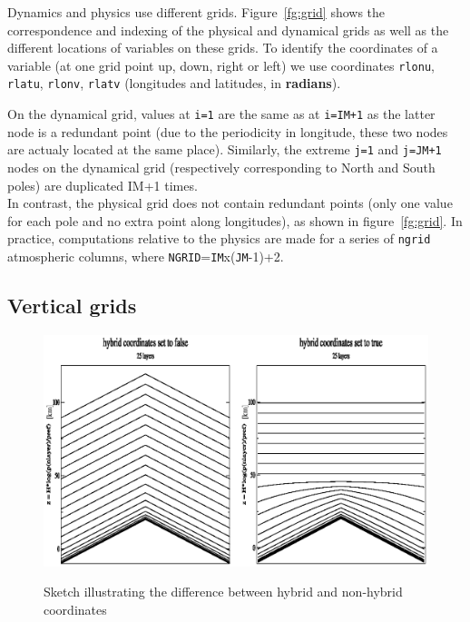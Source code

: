 Dynamics and physics use different grids.
Figure~\ref{fg:grid} shows the correspondence and indexing
of the physical and dynamical grids
as well as the different locations of variables on these grids.
To identify the coordinates of a variable (at one grid point up,
down, right or left)
we use coordinates {\tt rlonu}, {\tt rlatu},
 {\tt rlonv}, {\tt rlatv} (longitudes and
latitudes, in {\bf radians}).

On the dynamical grid, values at {\tt i=1} are the same as at {\tt i=IM+1}
as the latter node is a redundant point (due to the periodicity in longitude,
these two nodes are actualy located at the same place).
Similarly, the extreme {\tt j=1} and {\tt j=JM+1} nodes on the
dynamical grid (respectively corresponding to North and South poles)
are duplicated IM+1 times.\\
In contrast, the physical grid does not contain redundant points
(only one value for each pole and no extra point along longitudes),
as shown in figure~\ref{fg:grid}.
In practice, computations relative to the physics are made
for a series of {\tt ngrid} atmospheric
columns, where {\tt NGRID}={\tt IM}x({\tt JM}-1)+2.

\subsection{Vertical grids}

\begin{figure}[htbp]

{\includegraphics[scale=0.85,clip=true]{Fig/coord.eps}}
\caption[hybrides]
 {Sketch illustrating the difference between hybrid and non-hybrid coordinates}
 \label{fg:hybrid}
\end{figure}



